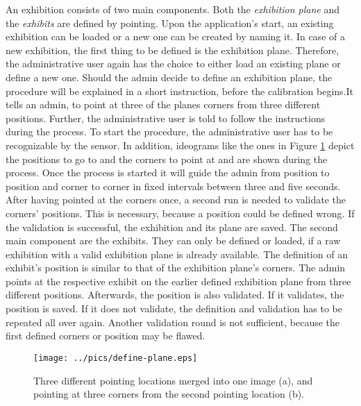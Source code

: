 An exhibition consists of two main components. Both the \textit{exhibition plane} and the \textit{exhibits} are defined by pointing. Upon the application's start, an existing exhibition can be loaded or a new one can be created by naming it. In case of a new exhibition, the first thing to be defined is the exhibition plane. Therefore, the administrative user again has the choice to either load an existing plane or define a new one. Should the admin decide to define an exhibition plane, the procedure will be explained in a short instruction, before the calibration begins.It tells an admin, to point at three of the planes corners from three different positions. Further, the administrative user is told to follow the instructions during the process. To start the procedure, the administrative user has to be recognizable by the sensor. In addition, ideograms like the ones in Figure \ref{fig:ideo_cali} depict the positions to go to and the corners to point at and are shown during the process. Once the process is started it will guide the admin from position to position and corner to corner in fixed intervals between three and five seconds. After having pointed at the corners once, a second run is needed to validate the corners' positions. This is necessary, because a position could be defined wrong. If the validation is successful, the exhibition and its plane are saved. The second main component are the exhibits. They can only be defined or loaded, if a raw exhibition with a valid exhibition plane is already available. The definition of an exhibit's position is similar to that of the exhibition plane's corners. The admin points at the respective exhibit on the earlier defined exhibition plane from three different positions. Afterwards, the position is also validated. If it validates, the position is saved. If it does not validate, the definition and validation has to be repeated all over again. Another validation round is not sufficient, because the first defined corners or position may be flawed.
\begin{figure}[H]%
\texttt{[image: ../pics/define-plane.eps]}%
\caption{Three different pointing locations merged into one image (a), and pointing at three corners from the second pointing location (b).}%
\label{fig:ideo_cali}%
\end{figure}

